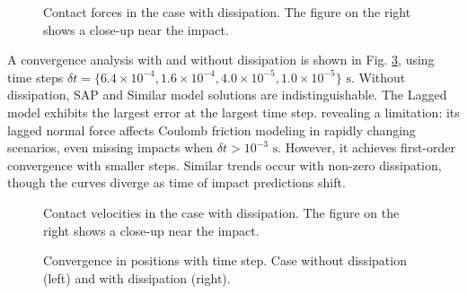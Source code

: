 \begin{figure}[!h]
    \centering
    \caption{\label{fig:rod_contact_force} Contact forces in the case
    with dissipation. The figure on the right shows a close-up near the impact.}
\end{figure}

A convergence analysis with and without dissipation is shown in Fig.
\ref{fig:rod_convergence}, using time steps $\delta t=\{6.4\times 10^{-4},
1.6\times 10^{-4}, 4.0\times 10^{-5}, 1.0\times 10^{-5}\}\text{ s}$. Without
dissipation, SAP and Similar model solutions are indistinguishable. The Lagged
model exhibits the largest error at the largest time step. revealing a limitation:
its lagged normal force affects Coulomb friction modeling in rapidly changing
scenarios, even missing impacts when $\delta t > 10^{-3}\text{ s}$. However, it
achieves first-order convergence with smaller steps. Similar trends occur with
non-zero dissipation, though the curves diverge as time of impact predictions shift.

\begin{figure}[!h]
    \centering
    \caption{\label{fig:rod_contact_velocity} Contact velocities in the case
    with dissipation. The figure on the right shows a close-up near the impact.}
\end{figure}


\begin{figure}[!h]
    \centering
    \caption{\label{fig:rod_convergence} Convergence in positions with
    time step. Case without dissipation (left) and with dissipation (right).}
\end{figure}

